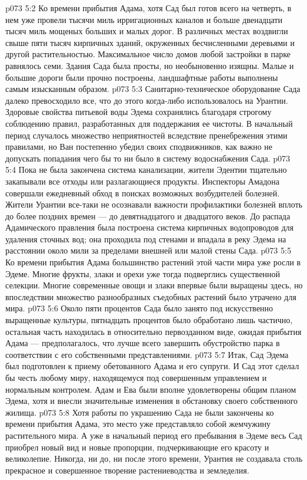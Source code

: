\vs p073 5:2 Ко времени прибытия Адама, хотя Сад был готов всего на четверть, в нем уже провели тысячи миль ирригационных каналов и больше двенадцати тысяч миль мощеных больших и малых дорог. В различных местах воздвигли свыше пяти тысяч кирпичных зданий, окруженных бесчисленными деревьями и другой растительностью. Максимальное число домов любой застройки в парке равнялось семи. Здания Сада была просты, но необыновенно изящны. Малые и большие дороги были прочно построены, ландшафтные работы выполнены самым изысканным образом.
\vs p073 5:3 Санитарно\hyp{}техническое оборудование Сада далеко превосходило все, что до этого когда\hyp{}либо использовалось на Урантии. Здоровые свойства питьевой воды Эдема сохранялись благодаря строгому соблюдению правил, разработанных для поддержания ее чистоты. В начальный период случалось множество неприятностей вследствие пренебрежения этими правилами, но Ван постепенно убедил своих сподвижников, как важно не допускать попадания чего бы то ни было в систему водоснабжения Сада.
\vs p073 5:4 Пока не была закончена система канализации, жители Эдентии тщательно закапывали все отходы или разлагающиеся продукты. Инспекторы Амадона совершали ежедневный обход в поисках возможных возбудителей болезней. Жители Урантии все\hyp{}таки не осознавали важности профилактики болезней вплоть до более поздних времен --- до девятнадцатого и двадцатого веков. До распада Адамического правления была построена система кирпичных водопроводов для удаления сточных вод; она проходила под стенами и впадала в реку Эдема на расстоянии около мили за пределами внешней или малой стены Сада.
\vs p073 5:5 Ко времени прибытия Адама большинство растений этой части мира уже росли в Эдеме. Многие фрукты, злаки и орехи уже тогда подверглись существенной селекции. Многие современные овощи и злаки впервые были выращены здесь, но впоследствии множество разнообразных съедобных растений было утрачено для мира.
\vs p073 5:6 Около пяти процентов Сада было занято под искусственно выращенные культуры, пятнадцать процентов было обработано лишь частично, остальная часть находилась в относительно первозданном виде, ожидая прибытия Адама --- предполагалось, что лучше всего завершить обустройство парка в соответствии с его собственными представлениями.
\vs p073 5:7 Итак, Сад Эдема был подготовлен к приему обетованного Адама и его супруги. И Сад этот сделал бы честь любому миру, находящемуся под совершенным управлением и нормальным контролем. Адам и Ева были вполне удовлетворены общим планом Эдема, хотя и внесли значительные изменения в обстановку своего собственного жилища.
\vs p073 5:8 Хотя работы по украшению Сада не были закончены ко времени прибытия Адама, это место уже представляло собой жемчужину растительного мира. А уже в начальный период его пребывания в Эдеме весь Сад приобрел новый вид и новые пропорции, подчеркивающие его красоту и великолепие. Никогда, ни до, ни после этого времени, Урантия не создавала столь прекрасное и совершенное творение растениеводства и земледелия.
